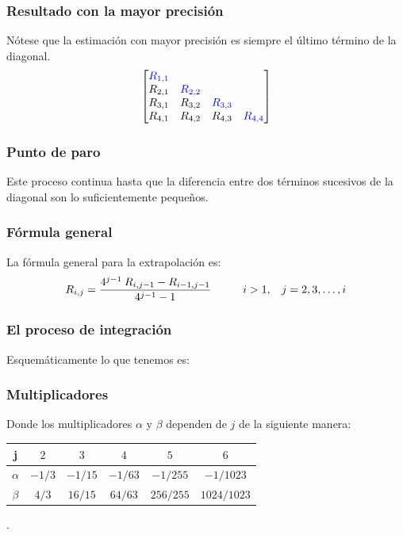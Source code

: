 \documentclass[12pt]{beamer}
\begin{document}
\begin{frame}
\frametitle{Resultado con la mayor precisión}
Nótese que la estimación con mayor precisión es siempre el último término de la diagonal.
\begin{align*}
\begin{bmatrix}
\textcolor{ao}{R_{1, 1}} &  & & \\
R_{2, 1} & \textcolor{ao}{R_{2, 2}} & & \\
R_{3, 1} & R_{3, 2} & \textcolor{ao}{R_{3, 3}} & \\
R_{4, 1} & R_{4, 2} & R_{4, 3} & \textcolor{ao}{R_{4, 4}}
\end{bmatrix}
\end{align*}    
\end{frame}
\begin{frame}
\frametitle{Punto de paro}
Este proceso continua hasta que la diferencia entre dos términos sucesivos de la diagonal son lo suficientemente pequeños.
\end{frame}
\begin{frame}
\frametitle{Fórmula general}
La fórmula general para la extrapolación es:
\pause
\begin{align*}
R_{i, j} = \dfrac{4^{j - 1} \: R_{i, j - 1} - R_{i - 1, j - 1} }{4^{j - 1} - 1} \hspace{1cm} i > 1, \hspace{0.3cm} j = 2, 3, \ldots, i
\end{align*}
\end{frame}
\begin{frame}[fragile]
\frametitle{El proceso de integración}
Esquemáticamente lo que tenemos es:
\pause
\begin{figure}
  \centering
  
\end{figure}
\end{frame}
\begin{frame}
\frametitle{Multiplicadores}
Donde los multiplicadores $\alpha$ y $\beta$ dependen de $j$ de la siguiente manera:
\pause
\fontsize{12}{12}\selectfont
\begin{table}
\centering
\begin{tabular}{c | c | c | c | c | c}
j & $2$ & $3$ & $4$ & $5$ & $6$ \\ \hline
$\alpha$ & $-1/3$ & $-1/15$ & $-1/63$ & $-1/255$ & $-1/1023$ \\ \hline
$\beta$ & $4/3$ & $16/15$ & $64/63$ & $256/255$ & $1024/1023$ \\ \hline
\end{tabular}
\end{table}.
\end{frame}
\end{document}
